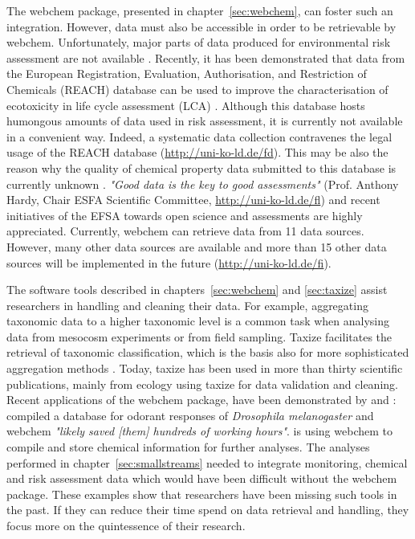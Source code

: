 The webchem package, presented in chapter~\ref{sec:webchem}, can foster such an integration.
However, data must also be accessible in order to be retrievable by webchem. 
Unfortunately, major parts of data produced for environmental risk assessment are not available \citep{schafer_letter_2013, dafforn_big_2015}. 
Recently, it has been demonstrated that data from the European Registration, Evaluation, Authorisation, and Restriction of Chemicals (REACH) database can be used to improve the characterisation of ecotoxicity in life cycle assessment (LCA) \citep{muller_exploring_2016}.
Although this database hosts humongous amounts of data used in risk assessment, it is currently not available in a convenient way.
Indeed, a systematic data collection contravenes the legal usage of the REACH database (\url{http://uni-ko-ld.de/fd}).
This may be also the reason why the quality of chemical property data submitted to this database is currently unknown \citep{stieger_assessing_2014, muller_exploring_2016}. 
\emph{"Good data is the key to good assessments"} (Prof. Anthony Hardy, Chair ESFA Scientific Committee, \url{http://uni-ko-ld.de/fl}) and recent initiatives of the EFSA towards open science and assessments are highly appreciated. 
Currently, webchem can retrieve data from 11 data sources. 
However, many other data sources are available and more than 15 other data sources will be implemented in the future (\url{http://uni-ko-ld.de/fi}).

The software tools described in chapters~\ref{sec:webchem} and \ref{sec:taxize} assist researchers in handling and cleaning their data. 
For example, aggregating taxonomic data to a higher taxonomic level is a common task when analysing data from mesocosm experiments or from field sampling.
Taxize facilitates the retrieval of taxonomic classification, which is the basis also for more sophisticated aggregation methods \citep{cuffney_ambiguous_2007}. 
Today, taxize has been used in more than thirty scientific publications, mainly from ecology using taxize for data validation and cleaning.
Recent applications of the webchem package, have been demonstrated by \citet{munch_door_2016} and \citet{ranke_chents_2016}: 
\citet{munch_door_2016} compiled a database for odorant responses of \textit{Drosophila melanogaster} and webchem \emph{"likely saved [them] hundreds of working hours"}. 
\citet{ranke_chents_2016} is using webchem to compile and store chemical information for further analyses. 
The analyses performed in chapter~\ref{sec:smallstreams} needed to integrate monitoring, chemical and risk assessment data which would have been difficult without the webchem package. 
These examples show that researchers have been missing such tools in the past.
If they can reduce their time spend on data retrieval and handling, they focus more on the quintessence of their research. 


